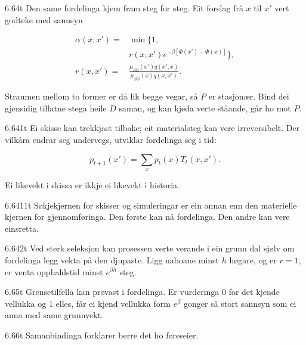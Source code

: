\begin{formproposition}{6.64}{t}
Den same fordelinga kjem fram steg for steg. Eit forslag frå \(x\) til \(x'\) vert godteke med sannsyn

\[
\begin{aligned}
\alpha(x,x')={}&\min\bigl\{1,\\
& r(x,x')e^{-\beta[\Phi(x')-\Phi(x)]}\bigr\},\\
r(x,x')={}&\frac{\mu_{SG}(x')q(x',x)}{\mu_{SG}(x)q(x,x')}.
\end{aligned}
\]

Straumen mellom to former er då lik begge vegar, så \(P\) er stasjonær. Bind dei gjensidig tillatne stega heile \(D\) saman, og kan kjeda verte ståande, går ho mot \(P\).
\end{formproposition}

\begin{formproposition}{6.641}{t}
Ei skisse kan trekkjast tilbake; eit materialsteg kan vere irreversibelt. Der vilkåra endrar seg undervegs, utviklar fordelinga seg i tid:

\[
p_{t+1}(x')=\sum_x p_t(x)T_t(x,x').
\]

Ei likevekt i skissa er ikkje ei likevekt i historia.
\end{formproposition}

\begin{formproposition}{6.6411}{t}
Søkjekjernen for skisser og simuleringar er ein annan enn den materielle kjernen for gjennomføringa. Den første kan nå fordelinga. Den andre kan vere einsretta.
\end{formproposition}

\begin{formproposition}{6.642}{t}
Ved sterk seleksjon kan prosessen verte verande i ein grunn dal sjølv om fordelinga legg vekta på den djupaste. Ligg naboane minst \(h\) høgare, og er \(r=1\), er venta opphaldstid minst \(e^{\beta h}\) steg.
\end{formproposition}

\begin{formproposition}{6.65}{t}
Grensetilfella kan prøvast i fordelinga. Er vurderinga 0 for det kjende vellukka og 1 elles, får ei kjend vellukka form \(e^{β}\) gonger så stort sannsyn som ei anna med same grunnvekt.
\end{formproposition}

\begin{formproposition}{6.66}{t}
Samanbindinga forklarer berre det ho føreseier.
\end{formproposition}


